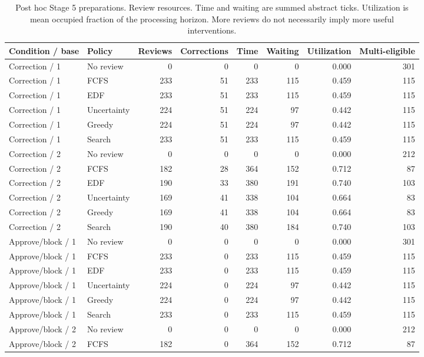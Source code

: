 \begin{table}[t]
\caption{Post hoc Stage 5 preparations. Review resources. Time and waiting are summed abstract ticks. Utilization is mean occupied fraction of the processing horizon. More reviews do not necessarily imply more useful interventions.}
\centering\small
\begin{tabular}{llrrrrrr}
\toprule
Condition / base & Policy & Reviews & Corrections & Time & Waiting & Utilization & Multi-eligible \\
\midrule
Correction / 1 & No review & 0 & 0 & 0 & 0 & 0.000 & 301 \\
Correction / 1 & FCFS & 233 & 51 & 233 & 115 & 0.459 & 115 \\
Correction / 1 & EDF & 233 & 51 & 233 & 115 & 0.459 & 115 \\
Correction / 1 & Uncertainty & 224 & 51 & 224 & 97 & 0.442 & 115 \\
Correction / 1 & Greedy & 224 & 51 & 224 & 97 & 0.442 & 115 \\
Correction / 1 & Search & 233 & 51 & 233 & 115 & 0.459 & 115 \\
Correction / 2 & No review & 0 & 0 & 0 & 0 & 0.000 & 212 \\
Correction / 2 & FCFS & 182 & 28 & 364 & 152 & 0.712 & 87 \\
Correction / 2 & EDF & 190 & 33 & 380 & 191 & 0.740 & 103 \\
Correction / 2 & Uncertainty & 169 & 41 & 338 & 104 & 0.664 & 83 \\
Correction / 2 & Greedy & 169 & 41 & 338 & 104 & 0.664 & 83 \\
Correction / 2 & Search & 190 & 40 & 380 & 184 & 0.740 & 103 \\
Approve/block / 1 & No review & 0 & 0 & 0 & 0 & 0.000 & 301 \\
Approve/block / 1 & FCFS & 233 & 0 & 233 & 115 & 0.459 & 115 \\
Approve/block / 1 & EDF & 233 & 0 & 233 & 115 & 0.459 & 115 \\
Approve/block / 1 & Uncertainty & 224 & 0 & 224 & 97 & 0.442 & 115 \\
Approve/block / 1 & Greedy & 224 & 0 & 224 & 97 & 0.442 & 115 \\
Approve/block / 1 & Search & 233 & 0 & 233 & 115 & 0.459 & 115 \\
Approve/block / 2 & No review & 0 & 0 & 0 & 0 & 0.000 & 212 \\
Approve/block / 2 & FCFS & 182 & 0 & 364 & 152 & 0.712 & 87 \\

\end{tabular}
\end{table}
